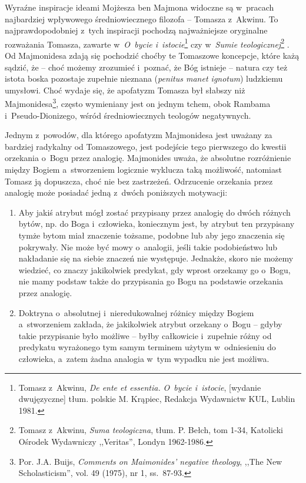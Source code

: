 Wyraźne inspiracje ideami Mojżesza ben Majmona widoczne są w~pracach najbardziej wpływowego średniowiecznego filozofa -- Tomasza z~Akwinu. To najprawdopodobniej z~tych inspiracji pochodzą najważniejsze oryginalne rozważania Tomasza, zawarte w~\textit{O~bycie i~istocie}\footnote{Tomasz z~Akwinu, \textit{De ente et essentia.} \textit{O~bycie i~istocie}, [wydanie dwujęzyczne] tłum. polskie M. Krąpiec, Redakcja Wydawnictw KUL, Lublin 1981.}
czy w~\textit{Sumie teologicznej}\footnote{Tomasz z~Akwinu, \textit{Suma teologiczna}, tłum. P. Bełch, tom 1-34, Katolicki Ośrodek Wydawniczy ,,Veritas'', Londyn 1962-1986.}
. Od Majmonidesa zdają się pochodzić choćby te Tomaszowe koncepcje, które każą sądzić, że -- choć możemy zrozumieć i~poznać, że Bóg istnieje -- natura czy też istota boska pozostaje zupełnie nieznana (\textit{penitus manet ignotum}) ludzkiemu umysłowi. Choć wydaje się, że apofatyzm Tomasza był słabszy niż Majmonidesa\footnote{Por. J.A. Buijs, \textit{Comments on Maimonides' negative theology}, ,,The New Scholasticism'', vol. 49 (1975), nr 1, ss.~87-93.}, często wymieniany jest on jednym tchem, obok Rambama i~Pseudo-Dionizego, wśród średniowiecznych teologów negatywnych.

Jednym z~powodów, dla którego apofatyzm Majmonidesa jest uważany za bardziej radykalny od Tomaszowego, jest podejście tego pierwszego do kwestii orzekania o~Bogu przez analogię. Majmonides uważa, że absolutne rozróżnienie między Bogiem a~stworzeniem logicznie wyklucza taką możliwość, natomiast Tomasz ją dopuszcza, choć nie bez zastrzeżeń. Odrzucenie orzekania przez analogię może posiadać jedną z~dwóch poniższych motywacji:
\begin{enumerate}[label = (\arabic*)]
\item Aby jakiś atrybut mógł zostać przypisany przez analogię do dwóch różnych bytów, np. do Boga i~człowieka, koniecznym jest, by atrybut ten przypisany tymże bytom miał znaczenie tożsame, podobne lub aby jego znaczenia się pokrywały. Nie może być mowy o~analogii, jeśli takie podobieństwo lub nakładanie się na siebie znaczeń nie występuje. Jednakże, skoro nie możemy wiedzieć, co znaczy jakikolwiek predykat, gdy wprost orzekamy go o~Bogu, nie mamy podstaw także do przypisania go Bogu na podstawie orzekania przez analogię.

\item Doktryna o~absolutnej i~nieredukowalnej różnicy między Bogiem a~stworzeniem zakłada, że jakikolwiek atrybut orzekany o~Bogu -- gdyby takie przypisanie było możliwe -- byłby całkowicie i~zupełnie różny od predykatu wyrażonego tym samym terminem użytym w~odniesieniu do człowieka, a~zatem żadna analogia w~tym wypadku nie jest możliwa.
\end{enumerate}

